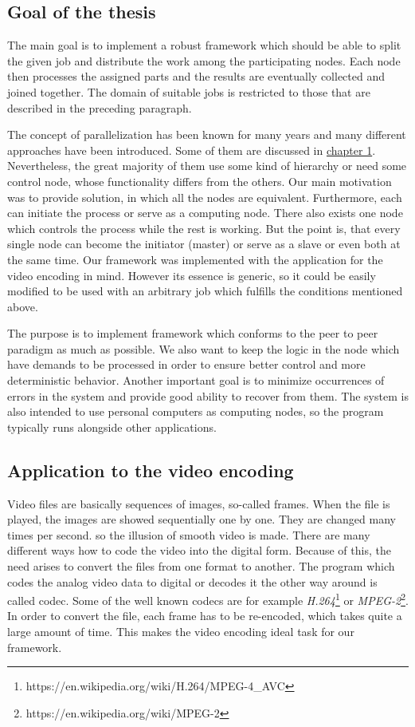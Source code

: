 \subsection*{Goal of the thesis} %
The main goal is to implement a robust framework which should be able to split the given job and  distribute the work among the participating nodes. Each node then processes the assigned parts and the results are eventually collected and joined together. The domain of suitable jobs is restricted to those that are described in the preceding paragraph.

The concept of parallelization has been known for many years and many different approaches have been introduced. Some of them are discussed in \hyperref[existing-solutions]{chapter 1}. Nevertheless, the great majority of them use some kind of hierarchy or need some control node, whose functionality differs from the others. Our main motivation was to provide solution, in which all the nodes are equivalent. Furthermore, each can initiate the process or serve as a computing node. There also exists one node which controls the process while the rest is working. But the point is, that every single node can become the initiator (master) or serve as a slave or even both at the same time. Our framework was implemented with the application for the video encoding in mind. However its essence is generic, so it could be easily modified to be used with an arbitrary job which fulfills the conditions mentioned above.

The purpose is to implement framework which conforms to the peer to peer paradigm as much as possible. We also want to keep the logic in the node which have demands to be processed in order to ensure better control and more deterministic behavior. Another important goal is to minimize occurrences of errors in the system and provide good ability to recover from them. The system is also intended to use personal computers as computing nodes, so the program typically runs alongside other applications.


\subsection*{Application to the video encoding}
Video files are basically sequences of images, so-called frames. When the file is played, the images are showed sequentially one by one. They are changed many times per second. so the illusion of smooth video is made. There are many different ways how to code the video into the digital form. Because of this, the need arises to convert the files from one format to another. The program which codes the analog video data to digital or decodes it the other way around is called codec. Some of the well known codecs are for example \textit{H.264}\footnote{https://en.wikipedia.org/wiki/H.264/MPEG-4\_AVC} or \textit{MPEG-2}\footnote{https://en.wikipedia.org/wiki/MPEG-2}. In order to convert the file, each frame has to be re-encoded, which takes quite a large amount of time. This makes the video encoding ideal task for our framework.

